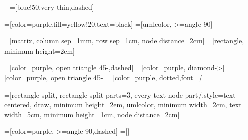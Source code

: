 
\makeatletter
\usetikzlibrary{arrows,shapes.multipart,backgrounds,fit}
+=[blue!50,very thin,dashed]


\newcommand{\umltextcolor}{black}
\newcommand{\umldrawcolor}{purple}
\newcommand{\umlfillcolor}{yellow!20}
=[color=\umldrawcolor,fill=\umlfillcolor,text=\umltextcolor]
=[umlcolor, >=angle 90]

=[matrix, column sep=1mm, row sep=1cm, node distance=2cm]
=[rectangle, minimum height=2em]

=[color=\umldrawcolor, open triangle 45-,dashed]
=[color=\umldrawcolor, diamond->]
=[color=\umldrawcolor, open triangle 45-]
=[color=\umldrawcolor, dotted,font=\itshape]

=[rectangle split, rectangle split parts=3,
every text node part/.style={text centered},
draw, minimum height=2em, umlcolor, minimum width=2cm, text width=5cm,
minimum height=1cm, node distance=2cm]


=[color=\umldrawcolor, >=angle 90,dashed]
=[]
\newif\ifsimplified\simplifiedtrue




\def\umlcdPackageFit{}

\newenvironment{class}[3][]%
{
\begin{classAndInterfaceCommon}{#1}{#2}{#3}
}%
{\calcuateNumberOfParts{}
\node[this umlcd style, anchor=north] (\umlcdClassName) at (\umlcdClassPos)
    {\classnamestyle{\umlcdClassName}
\insertAttributesAndOperations{}
};

\end{classAndInterfaceCommon}
}

